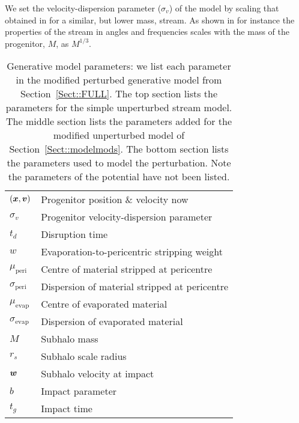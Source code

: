 \documentclass[useAMS,usenatbib,fleqn,a4paper]{mn2e}
\newcommand{\bs}[1]{\bmath{#1}}
\begin{document}
We set the velocity-dispersion parameter ($\sigma_v$) of the model by scaling that obtained in \cite{Bovy2014} for a similar, but lower mass, stream. As shown in \cite{SandersBinney2013a} for instance the properties of the stream in angles and frequencies scales with the mass of the progenitor, $M$, as $M^{1/3}$.

\begin{table}
\caption{Generative model parameters: we list each parameter in the modified perturbed generative model from Section~\ref{Sect::FULL}. The top section lists the parameters for the simple unperturbed stream model. The middle section lists the parameters added for the modified unperturbed model of Section~\ref{Sect::modelmods}. The bottom section lists the parameters used to model the perturbation. Note the parameters of the potential have not been listed.}
\begin{tabular}{ll}
$(\bs{x},\bs{v})$&Progenitor position \& velocity now\\
$\sigma_v$&Progenitor velocity-dispersion parameter\\
$t_d$&Disruption time\\
\hline
$w$&Evaporation-to-pericentric stripping weight\\
$\mu_\mathrm{peri}$&Centre of material stripped at pericentre\\
$\sigma_\mathrm{peri}$&Dispersion of material stripped at pericentre\\
$\mu_\mathrm{evap}$&Centre of evaporated material\\
$\sigma_\mathrm{evap}$&Dispersion of evaporated material\\
\hline
$M$& Subhalo mass\\
$r_s$& Subhalo scale radius\\
$\bs{w}$& Subhalo velocity at impact\\
$b$& Impact parameter\\
$t_g$& Impact time\\
\end{tabular}
\label{Parameters}
\end{table}
\end{document}
